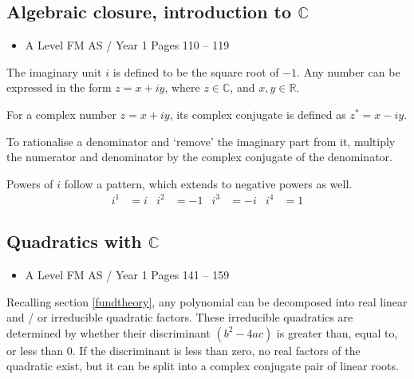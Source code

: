 \documentclass[11pt, a4paper]{article}
\begin{document}
\subsection{Algebraic closure, introduction to $\mathbb{C}$}
\begin{itemize}
\item A Level FM AS / Year 1 \hspace{1cm} Pages 110 -- 119
\end{itemize} \par
The imaginary unit $i$ is defined to be the square root of $-1$. Any number can be expressed in the form $z=x+iy$, where $z\in\mathbb{C}$, and $x,y\in\mathbb{R}$. \newline \par
For a complex number $z=x+iy$, its complex conjugate is defined as $z^{*}=x-iy$. \newline \par
To rationalise a denominator and `remove' the imaginary part from it, multiply the numerator and denominator by the complex conjugate of the denominator. \newline \par
Powers of $i$ follow a pattern, which extends to negative powers as well.
\begin{align*}
i^{1}&=i & i^{2}&=-1 & i^{3}&=-i & i^{4}&=1
\end{align*}
\vspace{0.25cm}


\subsection{Quadratics with $\mathbb{C}$}
\begin{itemize}
\item A Level FM AS / Year 1 \hspace{1cm} Pages 141 -- 159
\end{itemize} \par
Recalling section \ref{fundtheory}, any polynomial can be decomposed into real linear and / or irreducible quadratic factors. These irreducible quadratics are determined by whether their discriminant $\left(b^{2}-4ac\right)$ is greater than, equal to, or less than $0$. If the discriminant is less than zero, no real factors of the quadratic exist, but it can be split into a complex conjugate pair of linear roots.
\vspace{0.5cm}
\end{document}
